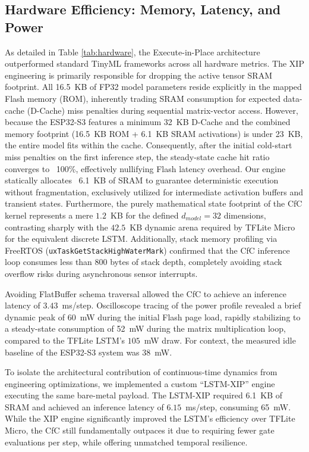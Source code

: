 \documentclass[conference]{IEEEtran}
\begin{document}
\subsection{Hardware Efficiency: Memory, Latency, and Power}
As detailed in Table \ref{tab:hardware}, the Execute-in-Place architecture outperformed standard TinyML frameworks across all hardware metrics. The XIP engineering is primarily responsible for dropping the active tensor SRAM footprint. All 16.5~KB of FP32 model parameters reside explicitly in the mapped Flash memory (ROM), inherently trading SRAM consumption for expected data-cache (D-Cache) miss penalties during sequential matrix-vector access. However, because the ESP32-S3 features a minimum 32~KB D-Cache and the combined memory footprint (16.5~KB ROM + 6.1~KB SRAM activations) is under 23~KB, the entire model fits within the cache. Consequently, after the initial cold-start miss penalties on the first inference step, the steady-state cache hit ratio converges to ~100\%, effectively nullifying Flash latency overhead. Our engine statically allocates ~6.1~KB of SRAM to guarantee deterministic execution without fragmentation, exclusively utilized for intermediate activation buffers and transient states. Furthermore, the purely mathematical state footprint of the CfC kernel represents a mere $1.2$~KB for the defined $d_{model}=32$ dimensions, contrasting sharply with the $42.5$~KB dynamic arena required by TFLite Micro for the equivalent discrete LSTM. Additionally, stack memory profiling via FreeRTOS (\texttt{uxTaskGetStackHighWaterMark}) confirmed that the CfC inference loop consumes less than 800 bytes of stack depth, completely avoiding stack overflow risks during asynchronous sensor interrupts. 

Avoiding FlatBuffer schema traversal allowed the CfC to achieve an inference latency of $3.43$~ms/step. Oscilloscope tracing of the power profile revealed a brief dynamic peak of 60~mW during the initial Flash page load, rapidly stabilizing to a steady-state consumption of 52~mW during the matrix multiplication loop, compared to the TFLite LSTM's $105$~mW draw. For context, the measured idle baseline of the ESP32-S3 system was $38$~mW. 

To isolate the architectural contribution of continuous-time dynamics from engineering optimizations, we implemented a custom ``LSTM-XIP'' engine executing the same bare-metal payload. The LSTM-XIP required 6.1~KB of SRAM and achieved an inference latency of $6.15$~ms/step, consuming 65~mW. While the XIP engine significantly improved the LSTM's efficiency over TFLite Micro, the CfC still fundamentally outpaces it due to requiring fewer gate evaluations per step, while offering unmatched temporal resilience.
\end{document}
